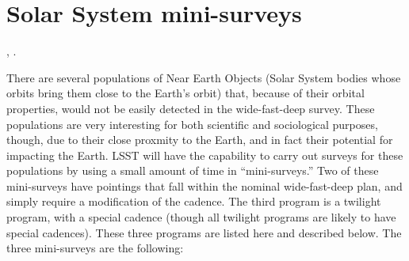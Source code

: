 %
%
%
%
%
%

\section{ Solar System mini-surveys }
\def\secname{solar_system_specials}\label{sec:\secname}

,
.



There are several populations of Near Earth Objects (Solar System
bodies whose orbits bring them close to the Earth's orbit) that,
because of their orbital properties, would not be easily
detected in the wide-fast-deep survey. These populations
are very interesting for both scientific and sociological
purposes, though, due to their close proxmity to the Earth,
and in fact their potential for impacting the Earth.
LSST will have the capability to carry out surveys for
these populations by using a small amount of time
in ``mini-surveys.'' Two of these mini-surveys have
pointings that fall within the nominal wide-fast-deep
plan, and simply require a modification of the cadence.
The third program is a twilight program, with a special
cadence (though all twilight programs are likely to 
have special cadences). These three programs are listed
here and described below. The three mini-surveys are the following:

